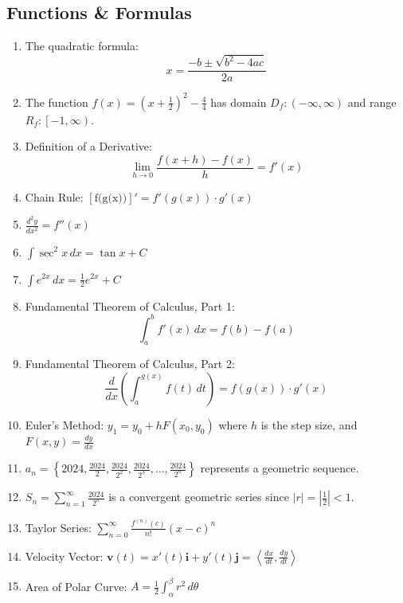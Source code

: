 \documentclass{article}
\begin{document}
\subsection{Functions \& Formulas}
\begin{enumerate}
    \item The quadratic formula: \[x = \frac{-b \pm \sqrt{b^2 - 4ac}}{2a}\]
    \item The function \(f(x) = \left(x + \frac{1}{2}\right)^2 - \frac{4}{4}\) has domain \(D_f: (-\infty, \infty)\) and range \(R_f: \left[-1, \infty\right)\).
    \item Definition of a Derivative: \[\lim_{h \to 0} \frac{f(x+h) - f(x)}{h} = f'(x)\]
    \item Chain Rule: \([\text{f(g(x))}]' = f'(g(x)) \cdot g'(x)\)
    \item \(\frac{d^2y}{dx^2} = f''(x)\)
    \item \(\int \sec^2 x \, dx = \tan x + C\)
    \item \(\int e^{2x} \, dx = \frac{1}{2}e^{2x} + C\)
    \item Fundamental Theorem of Calculus, Part 1: \[\int_{a}^{b} f'(x) \, dx = f(b) - f(a)\]
    \item Fundamental Theorem of Calculus, Part 2: \[\frac{d}{dx} \left( \int_{a}^{g(x)} f(t) \, dt \right) = f(g(x)) \cdot g'(x)\]
    \item Euler’s Method: \(y_1 = y_0 + hF(x_0, y_0)\) where \(h\) is the step size, and \(F(x, y) = \frac{dy}{dx}\)
    \item \(a_n = \left\{2024, \frac{2024}{2}, \frac{2024}{2^2}, \frac{2024}{2^3}, \ldots, \frac{2024}{2^n}\right\}\) represents a geometric sequence.
    \item \(S_n = \sum_{n=1}^{\infty} \frac{2024}{2^n}\) is a convergent geometric series since \(|r| = \left|\frac{1}{2}\right| < 1\).
    \item Taylor Series: \(\sum_{n=0}^{\infty} \frac{f^{(n)}(c)}{n!}(x - c)^n\)
    \item Velocity Vector: \(\mathbf{v}(t) = x'(t)\mathbf{i} + y'(t)\mathbf{j} = \left\langle \frac{dx}{dt}, \frac{dy}{dt} \right\rangle\)
    \item Area of Polar Curve: \(A = \frac{1}{2} \int_{\alpha}^{\beta} r^2 \, d\theta\)
\end{enumerate}
\end{document}
